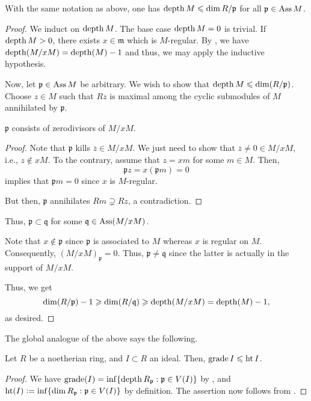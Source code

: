 \documentclass[12pt]{article}
\begin{document}
\begin{prop}
	With the same notation as above, one has $\operatorname{depth} M \leqslant \dim R/\mathfrak{p}$ for all $\mathfrak{p} \in \operatorname{Ass} M$.
\end{prop}
\begin{proof} 
	We induct on $\operatorname{depth} M$. The base case $\operatorname{depth} M = 0$ is trivial. \newline
	If $\operatorname{depth} M > 0$, there exists $x \in \mathfrak{m}$ which is $M$-regular. By , we have $\operatorname{depth}(M/xM) = \operatorname{depth}(M) - 1$ and thus, we may apply the inductive hypothesis.

	Now, let $\mathfrak{p} \in \operatorname{Ass} M$ be arbitrary. We wish to show that $\operatorname{depth} M \leqslant \dim(R/\mathfrak{p})$. Choose $z \in M$ such that $Rz$ is maximal among the cyclic submodules of $M$ annihilated by $\mathfrak{p}$.

	\claim{} $\mathfrak{p}$ consists of zerodivisors of $M/xM$.
	\begin{proof} 
		Note that $\mathfrak{p}$ kills $\overline{z} \in M/xM$. We just need to show that $\overline{z} \neq 0 \in M/xM$, i.e., $z \notin xM$. \newline
		To the contrary, assume that $z = xm$ for some $m \in M$. Then,
		\begin{equation*} 
			\mathfrak{p} z = x(\mathfrak{p} m) = 0
		\end{equation*}
		implies that $\mathfrak{p} m = 0$ since $x$ is $M$-regular.

		But then, $\mathfrak{p}$ annihilates $Rm \supsetneq Rz$, a contradiction.
	\end{proof}

	Thus, $\mathfrak{p} \subset \mathfrak{q}$ for some $\mathfrak{q} \in \operatorname{Ass}(M/xM)$. 

	Note that $x \notin \mathfrak{p}$ since $\mathfrak{p}$ is associated to $M$ whereas $x$ is regular on $M$. Consequently, $(M/xM)_{\mathfrak{p}} = 0$. Thus, $\mathfrak{p} \neq \mathfrak{q}$ since the latter is actually in the support of $M/xM$. 

	Thus, we get
	\begin{equation*} 
		\dim(R/\mathfrak{p}) - 1 \geqslant \dim(R/\mathfrak{q}) \geqslant \operatorname{depth}(M/xM) = \operatorname{depth}(M) - 1,
	\end{equation*}
	as desired.
\end{proof}

The global analogue of the above says the following.

\begin{prop}
	Let $R$ be a noetherian ring, and $I \subset R$ an ideal. Then, $\operatorname{grade} I \leqslant \operatorname{ht} I$.
\end{prop}
\begin{proof} 
	We have $\operatorname{grade}(I) = \inf\{\operatorname{depth} R_{\mathfrak{p}} : \mathfrak{p} \in V(I)\}$ by , and $\operatorname{ht}(I) \vcentcolon= \inf\{\dim R_{\mathfrak{p}} : \mathfrak{p} \in V(I)\}$ by definition. The assertion now follows from .
\end{proof}
\end{document}
